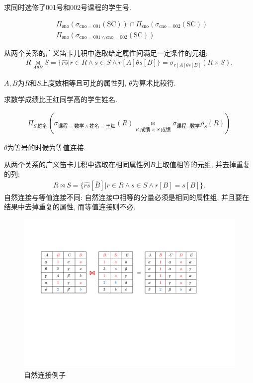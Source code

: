 \begin{example}
求同时选修了001号和002号课程的学生号.
\end{example}
\begin{align*}
    &\Pi_{\text{sno}}(\sigma_{\text{cno}=001}(\text{SC})) \cap \Pi_{\text{sno}}(\sigma_{\text{cno}=002}(\text{SC})) \\
    &\Pi_{\text{sno}}(\sigma_{\text{cno}=001\land \text{cno}=002}(\text{SC}))
\end{align*}

\begin{definition}[$\theta$连接]
从两个关系的广义笛卡儿积中选取给定属性间满足一定条件的元组:
\begin{align*}
    R \underset{{A\theta B}}{\bowtie} S = \{\widehat{rs}|r\in R \land s \in S \land r[A]\theta s[B]\}
    = \sigma_{r[A]\theta s[B]}(R\times S).
\end{align*}
\end{definition}

$A,B$为$R$和$S$上度数相等且可比的属性列, $\theta$为算术比较符.

\begin{example}
求数学成绩比王红同学高的学生姓名.
\end{example}
\begin{align*}
    \Pi_{S.\text{姓名}}\left(\sigma_{\text{课程}=\text{数学}\land \text{姓名}=\text{王红}}(R) \underset{R.\text{成绩}<S.\text{成绩}}{\bowtie}\sigma_{\text{课程}=\text{数学}}\rho_S(R)\right)
\end{align*}

\begin{definition}[等值连接]
$\theta$为等号的时候为等值连接.
\end{definition}

\begin{definition}[自然连接]
从两个关系的广义笛卡儿积中选取在相同属性列$B$上取值相等的元组, 并去掉重复的列:
\begin{align*}
    R \bowtie S = \{ \widehat{rs}[\bar{B}] | r \in R \land s \in S \land r[B]=s[B] \}.
\end{align*}
自然连接与等值连接不同: 自然连接中相等的分量必须是相同的属性组, 并且要在结果中去掉重复的属性, 而等值连接则不必.
\end{definition}

\begin{figure}[H]
    \centering
    \includegraphics[width=.8\textwidth]{./figure/自然连接.pdf}
    \caption{自然连接例子}
\end{figure}


